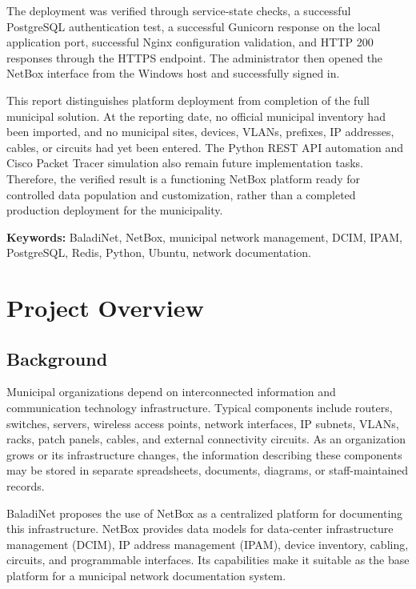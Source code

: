 \documentclass[11pt,a4paper,oneside]{report}
\begin{document}
The deployment was verified through service-state checks, a successful PostgreSQL authentication test, a successful Gunicorn response on the local application port, successful Nginx configuration validation, and HTTP 200 responses through the HTTPS endpoint. The administrator then opened the NetBox interface from the Windows host and successfully signed in.

This report distinguishes platform deployment from completion of the full municipal solution. At the reporting date, no official municipal inventory had been imported, and no municipal sites, devices, VLANs, prefixes, IP addresses, cables, or circuits had yet been entered. The Python REST API automation and Cisco Packet Tracer simulation also remain future implementation tasks. Therefore, the verified result is a functioning NetBox platform ready for controlled data population and customization, rather than a completed production deployment for the municipality.

\noindent\textbf{Keywords:} BaladiNet, NetBox, municipal network management, DCIM, IPAM, PostgreSQL, Redis, Python, Ubuntu, network documentation.

\clearpage
\tableofcontents
\listoftables
\clearpage
{}

\chapter{Project Overview}

\section{Background}
Municipal organizations depend on interconnected information and communication technology infrastructure. Typical components include routers, switches, servers, wireless access points, network interfaces, IP subnets, VLANs, racks, patch panels, cables, and external connectivity circuits. As an organization grows or its infrastructure changes, the information describing these components may be stored in separate spreadsheets, documents, diagrams, or staff-maintained records.

BaladiNet proposes the use of NetBox as a centralized platform for documenting this infrastructure. NetBox provides data models for data-center infrastructure management (DCIM), IP address management (IPAM), device inventory, cabling, circuits, and programmable interfaces. Its capabilities make it suitable as the base platform for a municipal network documentation system.
\end{document}
